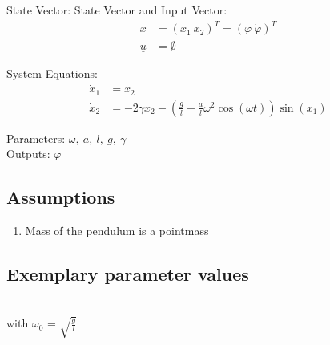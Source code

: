 \documentclass[10pt,a4paper]{article}
\begin{document}
	State Vector: 
		State Vector and Input Vector:
	\begin{align*}
		\underline{x} &= (x_1 \ x_2)^T = (\varphi \ \dot{\varphi})^T \\
		\underline{u} &= \emptyset
	\end{align*}
	
	\noindent System Equations:			
	\begin{subequations}
	\begin{align}
		\dot{x}_1 &= x_2 \\
		\dot{x}_2 &= -2\gamma x_2 - \left(\frac{g}{l} - \frac{a}{l}\omega^2\cos(\omega t)\right)\sin(x_1)
	\end{align}
	\end{subequations}

	\noindent
	Parameters: $\omega, ~a, ~l, ~g, ~\gamma$ %
	\\
	Outputs: $\varphi$ %
	
	
	\subsection{Assumptions} %
		\begin{enumerate} %
			\item Mass of the pendulum is a pointmass 
		\end{enumerate}
	
	
	\subsection{Exemplary parameter values}
	
	\\
	with $\omega_0$ = $\sqrt{\frac{g}{l}}$
\end{document}
